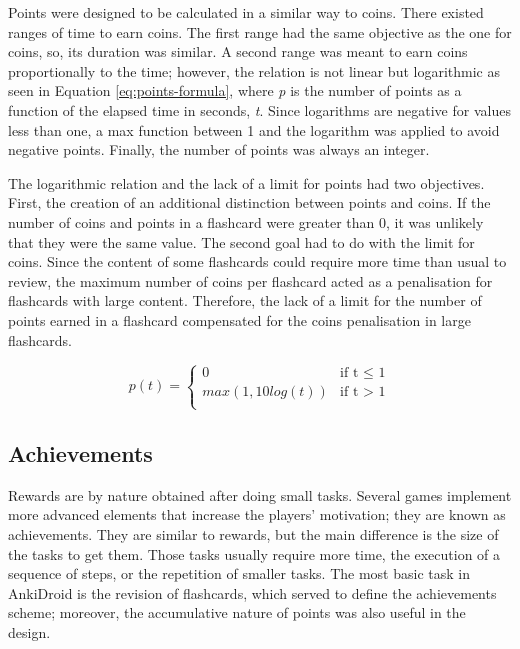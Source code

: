 Points were designed to be calculated in a similar way to coins. There existed ranges of time to earn coins. The first range had the same objective as the one for coins, so, its duration was similar. A second range was meant to earn coins proportionally to the time; however, the relation is not linear but logarithmic as seen in Equation \ref{eq:points-formula}, where \textit{p} is the number of points as a function of the elapsed time in seconds, \textit{t}. Since logarithms are negative for values less than one, a max function between 1 and the logarithm was applied to avoid negative points. Finally, the number of points was always an integer.

The logarithmic relation and the lack of a limit for points had two objectives. First, the creation of an additional distinction between points and coins. If the number of coins and points in a flashcard were greater than 0, it was unlikely that they were the same value. The second goal had to do with the limit for coins. Since the content of some flashcards could require more time than usual to review, the maximum number of coins per flashcard acted as a penalisation for flashcards with large content. Therefore, the lack of a limit for the number of points earned in a flashcard compensated for the coins penalisation in large flashcards.

\begin{equation}
  p(t) =
      \begin{cases}
        0 & \text{if t $\leq$ 1}\\
        max(1, 10log(t)) & \text{if t $>$ 1}\\
      \end{cases}
    \label{eq:points-formula}
\end{equation}

\subsection{Achievements}
Rewards are by nature obtained after doing small tasks. Several games implement more advanced elements that increase the players' motivation; they are known as achievements. They are similar to rewards, but the main difference is the size of the tasks to get them. Those tasks usually require more time, the execution of a sequence of steps, or the repetition of smaller tasks. The most basic task in AnkiDroid is the revision of flashcards, which served to define the achievements scheme; moreover, the accumulative nature of points was also useful in the design.

